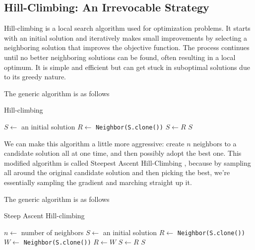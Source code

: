         \subsection{Hill-Climbing: An Irrevocable Strategy}
            Hill-climbing is a local search algorithm used for optimization problems. It starts with an initial solution and iteratively makes small improvements by selecting a neighboring solution that improves the objective function. The process continues until no better neighboring solutions can be found, often resulting in a local optimum. It is simple and efficient but can get stuck in suboptimal solutions due to its greedy nature.

            The generic algorithm is as follows

            \begin{algorithm}[!htp]
                \centering
                \caption{Hill-climbing}
                \begin{algorithmic}[1]
                    \State $S \gets$ an initial solution
                        \State $R \gets$ \texttt{Neighbor(S.clone())}
                            \State $S \gets R$
                        \EndIf
                    \EndWhile
                    \State \Return $S$
                \end{algorithmic}
            \end{algorithm}

            We can make this algorithm a little more aggressive: create $n$ neighbors to a candidate solution all at one time, and then possibly adopt the best one. This modified algorithm is called Steepest Ascent Hill-Climbing , because by sampling all around the original candidate solution and then picking the best, we’re essentially sampling the gradient and marching straight up it.

            The generic algorithm is as follows

            \begin{algorithm}[!htp]
                \centering
                \caption{Steep Ascent Hill-climbing}
                \begin{algorithmic}[1]
                    \State $n \gets$ number of neighbors
                    \State $S \gets$ an initial solution
                        \State $R \gets$ \texttt{Neighbor(S.clone())}
                            \State $W \gets$ \texttt{Neighbor(S.clone())}
                                \State $R \gets W$
                            \EndIf
                        \EndFor
                            \State $S \gets R$
                        \EndIf
                    \EndWhile
                    \State \Return $S$
                \end{algorithmic}
            \end{algorithm}

